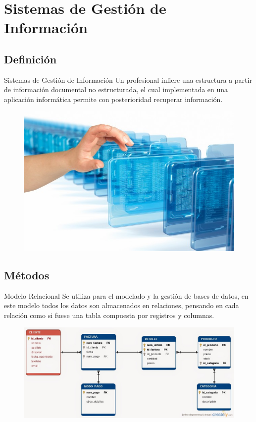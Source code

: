 \documentclass{beamer}
\begin{document}
\section{Sistemas de Gestión de Información}
\subsection{Definición}
\begin{frame}
\begin{block}{Sistemas de Gestión de Información}
Un profesional infiere una estructura a partir de información documental no estructurada, el cual implementada en una aplicación informática permite con posterioridad recuperar información.
\begin{figure}
\includegraphics[scale=0.3]{gestion.jpg}
\centering
\end{figure}
\end{block}
\end{frame}

\subsection{Métodos}
\begin{frame}
\begin{block}{Modelo Relacional}
Se utiliza para el modelado y la gestión de bases de datos, en este modelo todos los datos son almacenados en relaciones, pensando en cada relación como si fuese una tabla compuesta por registros y columnas.
\begin{figure}
\includegraphics[scale=0.2]{ModeloRelacional.jpg}
\centering
\end{figure}
\end{block}
\end{frame}
\end{document}
